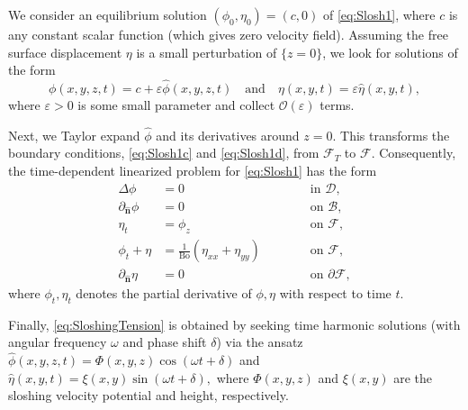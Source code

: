 \documentclass[letterpaper, 12pt]{amsart}
\newcommand{\bond}{\mathrm{Bo}}
\newcommand{\D}{\mathcal{D}}
\newcommand{\B}{\mathcal{B}}
\newcommand{\F}{\mathcal{F}}
\renewcommand{\O}{\mathcal{O}}
\newcommand{\n}{\mathbf{\hat{n}}}
\begin{document}
We consider an equilibrium solution $(\phi_0,\eta_0)=(c,0)$ of \eqref{eq:Slosh1}, where $c$ is any constant scalar function (which gives zero velocity field). Assuming the free surface displacement $\eta$ is a small perturbation of $\{z=0\}$,  we look for solutions of the form 
\begin{equation*}
\phi(x,y,z,t) = c + \varepsilon\hat\phi(x,y,z,t) 
\quad \textrm{and} \quad 
\eta(x,y,t) = \varepsilon\hat\eta(x,y,t), 
\end{equation*}
where $\varepsilon>0$ is some small parameter and collect  $\O(\varepsilon)$ terms. 

Next, we Taylor expand $\hat\phi$ and its derivatives around $z=0$. This transforms the boundary conditions,  \eqref{eq:Slosh1c} and \eqref{eq:Slosh1d}, from $\F_T$ to $\F$.  Consequently, the time-dependent  linearized problem for \eqref{eq:Slosh1} has the form
\begin{subequations}\label{eq:Slosh2}
\begin{alignat}{2}
\Delta\phi & = 0 && \qquad\textrm{ in }\D, \\
\partial_\n\phi & = 0 && \qquad\textrm{ on }\B, \\
\eta_t & = \phi_z && \qquad\textrm{ on }\F, \\
\phi_t + \eta & = \frac{1}{\bond}(\eta_{xx} + \eta_{yy}) && \qquad\textrm{ on }\F, \\
\partial_\n\eta & = 0 && \qquad\textrm{ on }\partial\F, 
\end{alignat}
\end{subequations}
where $\phi_t,\eta_t$ denotes the partial derivative of $\phi,\eta$ with respect to time $t$. 

Finally, \eqref{eq:SloshingTension} is obtained by  seeking time harmonic solutions (with angular frequency $\omega$ and phase shift $\delta$) via the ansatz $ \hat\phi(x,y,z,t) = \Phi(x,y,z)\cos(\omega t + \delta)$ and $ \hat\eta(x,y,t) =\xi(x,y)\sin(\omega t + \delta),$ where $\Phi(x,y,z)$ and $\xi(x,y)$ are the sloshing velocity potential and height, respectively. 

\clearpage
{%

%
 }
\end{document}
